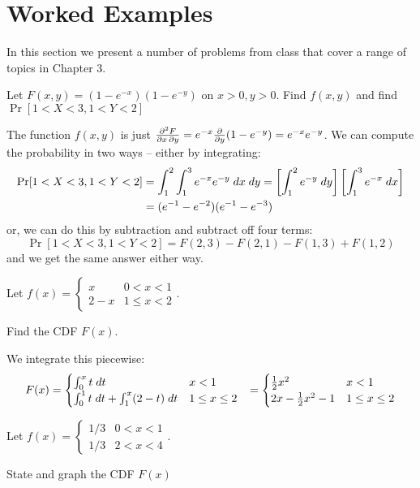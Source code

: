 \documentclass[../main.tex]{subfiles}
\begin{document}
\section{Worked Examples}
In this section we present a number of problems from class that cover a range of topics in Chapter 3.
\begin{example} %
	Let $F(x,y) = (1-e^{-x})(1-e^{-y})$ on $x>0, y>0$. Find $f(x,y)$ and find 
	$\Pr[1<X<3, 1<Y<2]$
\end{example}
\begin{solution}
The function $f(x, y)$ is just $\frac{\partial^2 F}{\partial x \, \partial y} = e^{-x} \frac{\partial }{\partial y}(1-e^{-y}) = e^{-x} e^{-y}$. We can compute the probability in two ways -- either by integrating: 
\begin{align*}
    \mathrm{Pr}[1<X<3, 1<Y<2] &= \int_1^2 \int_1^3 e^{-x} e^{-y} \;dx \;dy = \left[\int_1^2 e^{-y} \;dy \right] \left[\int_1^3 e^{-x} \;dx \right] \\&= (e^{-1} - e^{-2}) (e^{-1} - e^{-3}) 
\end{align*}
or, we can do this by subtraction and subtract off four terms: 
\[
    \Pr[1<X<3, 1<Y<2] = F(2,3) - F(2,1) - F(1,3) + F(1,2) 
\]
and we get the same answer either way. 
\end{solution}
\begin{example} %
	Let $f(x) = \begin{cases} x & 0<x<1 \\ 2-x & 1 \leq x < 2\end{cases}$. 
	
	Find the CDF $F(x)$.
\end{example}
\begin{solution}
We integrate this piecewise: 
\begin{align*}
    F(x) &= \begin{cases} \int_0^x t \;dt & x < 1 \\ \int_0^1 t \;dt + \int_1^x (2-t) \;dt & 1\leq x \leq 2
\end{cases}
&= \begin{cases} \frac 12 x^2 & x < 1 \\ 2x - \frac 12 x^2 - 1 & 1\leq x \leq 2
\end{cases}
\end{align*}
\end{solution}
\begin{example} %
	Let $f(x) = \begin{cases}1/3 & 0<x<1 \\ 1/3 & 2<x<4 \end{cases}$.
	
	State and graph the CDF $F(x)$
\end{example}
\end{document}
